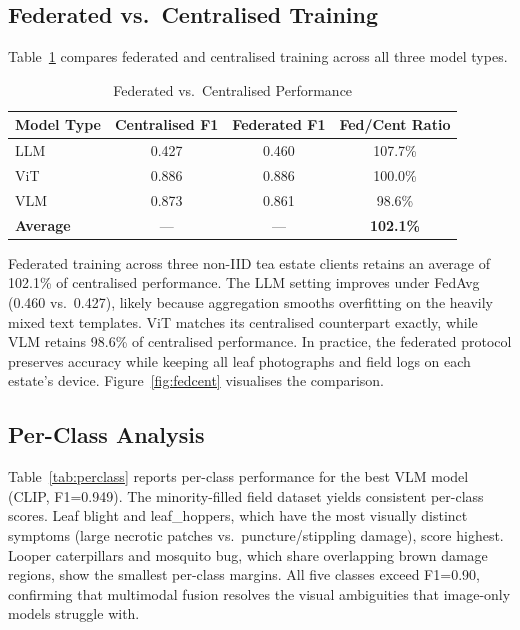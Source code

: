 \documentclass[12pt, a4paper, oneside]{Thesis}
\begin{document}
\subsection{Federated vs.\ Centralised Training}

Table~\ref{tab:fedcent} compares federated and centralised training across all three
model types.

\begin{table}[t]
\caption{Federated vs.\ Centralised Performance}
\label{tab:fedcent}
\centering\footnotesize
\begin{tabular}{lccc}
\toprule
\textbf{Model Type} & \textbf{Centralised F1} &
\textbf{Federated F1} & \textbf{Fed/Cent Ratio}\\
\midrule
LLM & 0.427 & 0.460 & 107.7\% \\
ViT & 0.886 & 0.886 & 100.0\% \\
VLM & 0.873 & 0.861 & 98.6\% \\
\midrule
\textbf{Average} & --- & --- & \textbf{102.1\%}\\
\bottomrule
\end{tabular}
\end{table}

Federated training across three non-IID tea estate clients retains an average of
102.1\% of centralised performance. The LLM setting improves under FedAvg
(0.460 vs.\ 0.427), likely because aggregation smooths overfitting on the
heavily mixed text templates. ViT matches its centralised counterpart exactly,
while VLM retains 98.6\% of centralised performance. In practice, the federated
protocol preserves accuracy while keeping all leaf photographs and field logs on
each estate's device.
Figure~\ref{fig:fedcent} visualises the comparison.

\subsection{Per-Class Analysis}

Table~\ref{tab:perclass} reports per-class performance for the best VLM model
(CLIP, F1=0.949). The minority-filled field dataset yields consistent per-class
scores. Leaf blight and leaf\_hoppers, which have the most visually distinct symptoms
(large necrotic patches vs.\ puncture/stippling damage), score highest. Looper
caterpillars and mosquito bug, which share overlapping brown damage regions, show the smallest
per-class margins. All five classes exceed F1=0.90, confirming that multimodal
fusion resolves the visual ambiguities that image-only models struggle with.
\end{document}
